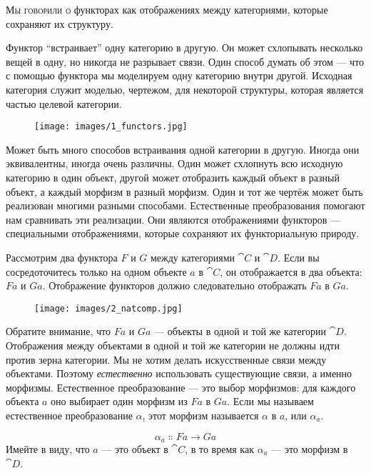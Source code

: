 
\lettrine[lhang=0.17]{М}{ы говорили о} функторах как отображениях между категориями, которые сохраняют
их структуру.

Функтор ``встраивает'' одну категорию в другую. Он может
схлопывать несколько вещей в одну, но никогда не разрывает связи. Один
способ думать об этом --- что с помощью функтора мы моделируем одну
категорию внутри другой. Исходная категория служит моделью,
чертежом, для некоторой структуры, которая является частью целевой категории.

\begin{figure}[H]
  \centering\texttt{[image: images/1\_functors.jpg]}
\end{figure}

\noindent
Может быть много способов встраивания одной категории в другую. Иногда
они эквивалентны, иногда очень различны. Один может схлопнуть
всю исходную категорию в один объект, другой может отобразить каждый объект в
разный объект, а каждый морфизм в разный морфизм. Один и тот же
чертёж может быть реализован многими разными способами. Естественные
преобразования помогают нам сравнивать эти реализации. Они являются отображениями
функторов --- специальными отображениями, которые сохраняют их функториальную природу.

Рассмотрим два функтора $F$ и $G$ между категориями
$\cat{C}$ и $\cat{D}$. Если вы сосредоточитесь только на одном объекте $a$ в
$\cat{C}$, он отображается в два объекта: $F a$ и $G a$.
Отображение функторов должно следовательно отображать $F a$ в
$G a$.

\begin{figure}[H]
  \centering
  \texttt{[image: images/2\_natcomp.jpg]}
\end{figure}

\noindent
Обратите внимание, что $F a$ и $G a$ --- объекты в одной и той же
категории $\cat{D}$. Отображения между объектами в одной и той же категории не должны
идти против зерна категории. Мы не хотим делать
искусственные связи между объектами. Поэтому \emph{естественно} использовать
существующие связи, а именно морфизмы. Естественное преобразование --- это
выбор морфизмов: для каждого объекта $a$ оно выбирает один
морфизм из $F a$ в $G a$. Если мы называем естественное
преобразование $\alpha$, этот морфизм называется 
$\alpha$ в $a$, или $\alpha_a$.

\[\alpha_a \Colon F a \to G a\]
Имейте в виду, что $a$ --- это объект в $\cat{C}$, в то время как $\alpha_a$
--- это морфизм в $\cat{D}$.

